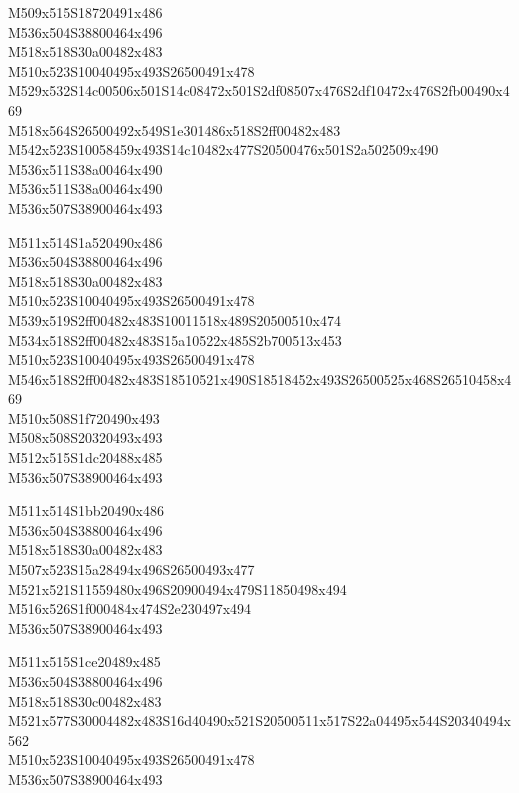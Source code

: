 \documentclass{article}
\begin{document}
\begin{multicols}{5}
\begin{center}

M509x515S18720491x486 %
\\M536x504S38800464x496 %
\\M518x518S30a00482x483 %
\\M510x523S10040495x493S26500491x478 %
\\M529x532S14c00506x501S14c08472x501S2df08507x476S2df10472x476S2fb00490x469 %
\\M518x564S26500492x549S1e301486x518S2ff00482x483 %
\\M542x523S10058459x493S14c10482x477S20500476x501S2a502509x490 %
\\M536x511S38a00464x490 %
\\M536x511S38a00464x490 %
\\M536x507S38900464x493 %
\vfil
\columnbreak

M511x514S1a520490x486 %
\\M536x504S38800464x496 %
\\M518x518S30a00482x483 %
\\M510x523S10040495x493S26500491x478 %
\\M539x519S2ff00482x483S10011518x489S20500510x474 %
\\M534x518S2ff00482x483S15a10522x485S2b700513x453 %
\\M510x523S10040495x493S26500491x478 %
\\M546x518S2ff00482x483S18510521x490S18518452x493S26500525x468S26510458x469 %
\\M510x508S1f720490x493 %
\\M508x508S20320493x493 %
\\M512x515S1dc20488x485 %
\\M536x507S38900464x493 %
\vfil
\columnbreak

M511x514S1bb20490x486 %
\\M536x504S38800464x496 %
\\M518x518S30a00482x483 %
\\M507x523S15a28494x496S26500493x477 %
\\M521x521S11559480x496S20900494x479S11850498x494 %
\\M516x526S1f000484x474S2e230497x494 %
\\M536x507S38900464x493 %
\vfil
\columnbreak

M511x515S1ce20489x485 %
\\M536x504S38800464x496 %
\\M518x518S30c00482x483 %
\\M521x577S30004482x483S16d40490x521S20500511x517S22a04495x544S20340494x562 %
\\M510x523S10040495x493S26500491x478 %
\\M536x507S38900464x493 %
\vfil
\columnbreak


\end{center}
\end{multicols}
\end{document}
